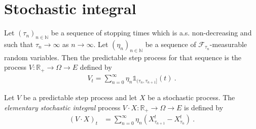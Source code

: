 \section{Stochastic integral}


\begin{definition}\label{def:predictableStepProcess}
Let $(\tau_n)_{n \in \mathbb{N}}$ be a sequence of stopping times which is a.s. non-decreasing and such that $\tau_n \to \infty$ as $n \to \infty$.
Let $(\eta_n)_{n \in \mathbb{N}}$ be a sequence of $\mathcal{F}_{\tau_n}$-measurable random variables.
Then the predictable step process for that sequence is the process $V : \mathbb{R}_+ \to \Omega \to E$ defined by
\begin{align*}
  V_t = \sum_{n=0}^\infty \eta_n \mathbb{1}_{(\tau_n, \tau_{n+1}]}(t)
  \: .
\end{align*}
\end{definition}


\begin{definition}\label{def:elementaryStochasticIntegral}
Let $V$ be a predictable step process and let $X$ be a stochastic process.
The \emph{elementary stochastic integral} process $V \cdot X : \mathbb{R}_+ \to \Omega \to E$ is defined by
\begin{align*}
  (V \cdot X)_t
  &= \sum_{n=0}^\infty \eta_n (X^t_{\tau_{n+1}} - X^t_{\tau_n})
  \: .
\end{align*}
\end{definition}
